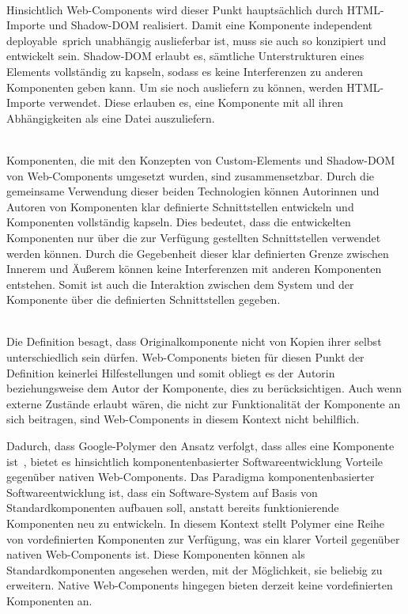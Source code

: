 \begin{enumerate}

\hfill \\
Hinsichtlich Web-Components wird dieser Punkt hauptsächlich durch HTML-Importe und Shadow-DOM  realisiert. Damit eine Komponente \glqq independent deployable\grqq\ sprich unabhängig auslieferbar ist, muss sie auch so konzipiert und entwickelt sein. Shadow-DOM erlaubt es, sämtliche Unterstrukturen eines Elements vollständig zu kapseln, sodass es keine Interferenzen zu anderen Komponenten geben kann. Um sie noch ausliefern zu können, werden HTML-Importe verwendet. Diese erlauben es, eine Komponente mit all ihren Abhängigkeiten als eine Datei auszuliefern.

 \hfill \\
Komponenten, die mit den Konzepten von Custom-Elements und Shadow-DOM von Web-Components umgesetzt wurden, sind zusammensetzbar. Durch die gemeinsame Verwendung dieser beiden Technologien können Autorinnen und Autoren von Komponenten klar definierte Schnittstellen entwickeln und Komponenten vollständig kapseln. Dies bedeutet, dass die entwickelten Komponenten nur über die zur Verfügung gestellten Schnittstellen verwendet werden können. Durch die Gegebenheit dieser klar definierten Grenze zwischen Innerem und Äußerem können keine Interferenzen mit anderen Komponenten entstehen. Somit ist auch die Interaktion zwischen dem System und der Komponente über die definierten Schnittstellen gegeben.

\hfill \\
Die Definition besagt, dass Originalkomponente nicht von Kopien ihrer selbst unterschiedlich sein dürfen. Web-Components bieten für diesen Punkt der Definition keinerlei Hilfestellungen und somit obliegt es der Autorin beziehungsweise dem Autor der Komponente, dies zu berücksichtigen.
Auch wenn externe Zustände erlaubt wären, die nicht zur Funktionalität der Komponente an sich beitragen, sind Web-Components in diesem Kontext nicht behilflich.

\end{enumerate}

Dadurch, dass Google-Polymer den Ansatz verfolgt, dass \glqq alles eine Komponente ist\grqq\ \citereset \autocite{Polymer}, bietet es hinsichtlich komponentenbasierter Softwareentwicklung Vorteile gegenüber nativen Web-Components.
Das Paradigma komponentenbasierter Softwareentwicklung ist, dass ein Software-System auf Basis von Standardkomponenten aufbauen soll, anstatt bereits funktionierende Komponenten neu zu entwickeln. In diesem Kontext stellt Polymer eine Reihe von vordefinierten Komponenten zur Verfügung, was ein klarer Vorteil gegenüber nativen Web-Components ist. Diese Komponenten können als Standardkomponenten angesehen werden, mit der Möglichkeit, sie beliebig zu erweitern. Native Web-Components hingegen bieten derzeit keine vordefinierten Komponenten an.

